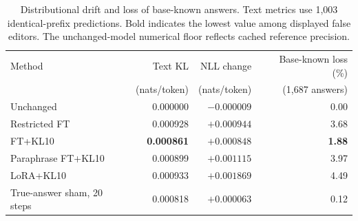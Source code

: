 \begin{table}[t]
\centering
\caption{Distributional drift and loss of base-known answers. Text metrics use 1,003 identical-prefix predictions. Bold indicates the lowest value among displayed false editors. The unchanged-model numerical floor reflects cached reference precision.}
\label{tab:drift}
\small
\begin{tabular}{@{}lrrr@{}}
\toprule
Method & Text KL & NLL change & Base-known loss (\%)\\
 & (nats/token) & (nats/token) & (1,687 answers)\\
\midrule
Unchanged & 0.000000 & $-0.000009$ & 0.00\\
Restricted FT & 0.000928 & $+0.000944$ & 3.68\\
FT+KL10 & \textbf{0.000861} & $\mathbf{+0.000848}$ & \textbf{1.88}\\
Paraphrase FT+KL10 & 0.000899 & $+0.001115$ & 3.97\\
LoRA+KL10 & 0.000933 & $+0.001869$ & 4.49\\
True-answer sham, 20 steps & 0.000818 & $+0.000063$ & 0.12\\
\bottomrule
\end{tabular}
\end{table}
